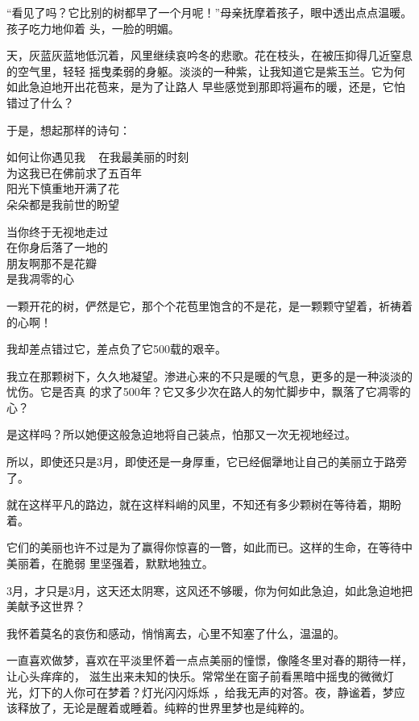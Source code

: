 \documentclass[12pt,a4paper]{article}
\begin{document}
		“看见了吗？它比别的树都早了一个月呢！”母亲抚摩着孩子，眼中透出点点温暖。孩子吃力地仰着
	头，一脸的明媚。

		天，灰蓝灰蓝地低沉着，风里继续哀吟冬的悲歌。花在枝头，在被压抑得几近窒息的空气里，轻轻
	摇曳柔弱的身躯。淡淡的一种紫，让我知道它是紫玉兰。它为何如此急迫地开出花苞来，是为了让路人
	早些感觉到那即将遍布的暖，还是，它怕错过了什么？

		于是，想起那样的诗句：

		\longpoem{}{}{}
		如何让你遇见我 ~ 在我最美丽的时刻 \\
		为这我已在佛前求了五百年 \\
		阳光下慎重地开满了花 \\
		朵朵都是我前世的盼望

		当你终于无视地走过 \\
		在你身后落了一地的 \\
		朋友啊那不是花瓣 \\
		是我凋零的心
		\endlongpoem

		一颗开花的树，俨然是它，那个个花苞里饱含的不是花，是一颗颗守望着，祈祷着的心啊！

		我却差点错过它，差点负了它500载的艰辛。

		我立在那颗树下，久久地凝望。渗进心来的不只是暖的气息，更多的是一种淡淡的忧伤。它是否真
	的求了500年？它又多少次在路人的匆忙脚步中，飘落了它凋零的心？

		是这样吗？所以她便这般急迫地将自己装点，怕那又一次无视地经过。

		所以，即使还只是3月，即使还是一身厚重，它已经倔犟地让自己的美丽立于路旁了。

		就在这样平凡的路边，就在这样料峭的风里，不知还有多少颗树在等待着，期盼着。

		它们的美丽也许不过是为了赢得你惊喜的一瞥，如此而已。这样的生命，在等待中美丽着，在脆弱
	里坚强着，默默地独立。

		3月，才只是3月，这天还太阴寒，这风还不够暖，你为何如此急迫，如此急迫地把美献予这世界？

		我怀着莫名的哀伤和感动，悄悄离去，心里不知塞了什么，温温的。

	\endwriting



		一直喜欢做梦，喜欢在平淡里怀着一点点美丽的憧憬，像隆冬里对春的期待一样，让心头痒痒的，
	滋生出来未知的快乐。常常坐在窗子前看黑暗中摇曳的微微灯光，灯下的人你可在梦着？灯光闪闪烁烁
	，给我无声的对答。夜，静谧着，梦应该释放了，无论是醒着或睡着。纯粹的世界里梦也是纯粹的。
\end{document}
